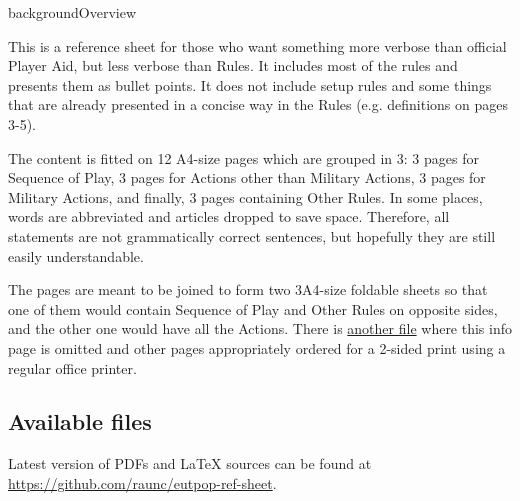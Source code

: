 \documentclass[10pt]{article}
\begin{document}
\thispagestyle{empty}
\ifrenderbw
\else
  \begin{staticcontents*}{backgroundOverview}
  \end{staticcontents*}
\fi


This is a reference sheet for those who want something more verbose than official Player Aid,
but less verbose than Rules.
It includes most of the rules and presents them as bullet points.
It does not include setup rules and some things that are already presented in a concise way
in the Rules (e.g. definitions on pages 3-5).


The content is fitted on 12 A4-size pages which are grouped in 3:
3 pages for Sequence of Play, 3 pages for Actions other than Military Actions,
3 pages for Military Actions, and finally, 3 pages containing Other Rules.
In some places, words are abbreviated and articles dropped to save space.
Therefore, all statements are not grammatically correct sentences, but hopefully they are still easily understandable.


The pages are meant to be joined to form two 3\texttimes A4-size foldable sheets so that
one of them would contain Sequence of Play and Other Rules on opposite sides,
and the other one would have all the Actions.
There is \href{https://github.com/raunc/eutpop-ref-sheet/blob/main/pdf/eutpop\_ref\_sheet\_print\_2\_sided.pdf}{another file}
where this info page is omitted and other pages appropriately ordered for a 2-sided print using a regular office printer.


\subsection*{Available files}

Latest version of PDFs and \LaTeX\xspace sources can be found at \href{https://github.com/raunc/eutpop-ref-sheet}{https://github.com/raunc/eutpop-ref-sheet}.
\end{document}
